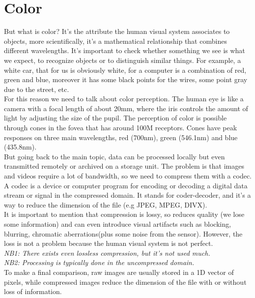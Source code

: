 \section{Color}
But what is color? It's the attribute the human visual system associates to objects, more scientifically, it's a mathematical relationship that combines different wavelengths. 
It's important to check whether something we see is what we expect, to recognize objects or to distinguish similar things. For example, a white car, that for us is obviously white, for a computer is a combination of red, green and blue, moreover it has some black points for the wires, some point gray due to the street, etc.
\\For this reason we need to talk about color perception. The human eye is like a camera with a focal length of about 20mm, where the iris controls the amount of light by adjusting the size of the pupil. 
The perception of color is possible through cones in the fovea that has around 100M receptors.  Cones have peak responses on three main wavelengths, red (700nm), green (546.1nm) and blue (435.8nm).
\\
But going back to the main topic, data can be processed locally but even transmitted remotely or archived on a storage unit. The problem is that images and videos require a lot of bandwidth, so we need to compress them with a codec.
A codec is a device or computer program for encoding or decoding a digital data stream or signal in the compressed domain. It stands for coder-decoder, and it's a way to reduce the dimension of the file (e.g JPEG, MPEG, DIVX). 
\\It is important to mention that compression is lossy, so reduces quality (we lose some information) and can even introduce visual artifacts such as blocking, blurring, chromatic aberrations(plus some noise from the sensor). However, the loss is not a problem because the human visual system is not perfect.
\\\textit{NB1: There exists even lossless compression, but it's not used much.
\\NB2: Processing is typically done in the uncompressed domain.}
\\To make a final comparison, raw images are usually stored in a 1D vector of pixels, while compressed images reduce the dimension of the file with or without loss of information.

